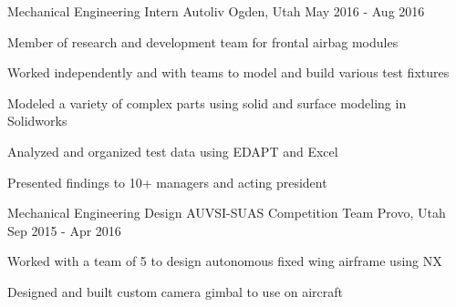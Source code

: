 \begin{cventries}
  \cventry
    {Mechanical Engineering Intern} %
    {Autoliv} %
    {Ogden, Utah} %
    {May 2016 - Aug 2016} %
    {
      \begin{cvitems} %
        \item {Member of research and development team for frontal airbag modules}
        \item {Worked independently and with teams to model and build various test fixtures}
        \item {Modeled a variety of complex parts using solid and surface modeling in Solidworks}
        \item {Analyzed and organized test data using EDAPT and Excel}
        \item {Presented findings to 10+ managers and acting president}
      \end{cvitems}
    }


  \cventry
    {Mechanical Engineering Design} %
    {AUVSI-SUAS Competition Team} %
    {Provo, Utah} %
    {Sep 2015 - Apr 2016} %
    {
      \begin{cvitems} %
        \item {Worked with a team of 5 to design autonomous fixed wing airframe using NX}
        \item {Designed and built custom camera gimbal to use on aircraft}
      \end{cvitems}
    }
\end{cventries}
